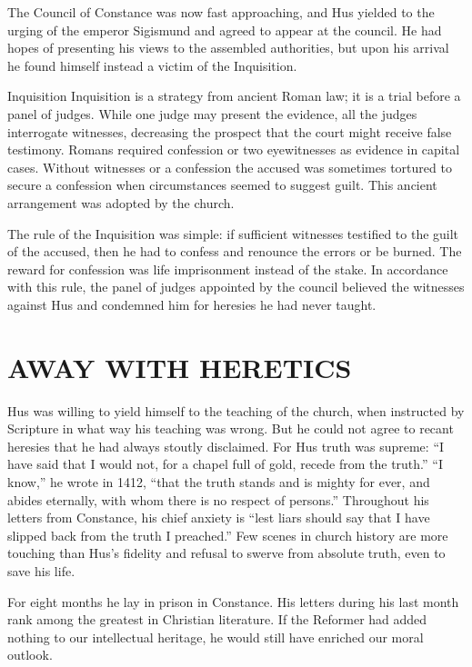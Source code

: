The Council of Constance was now fast approaching, and Hus yielded to the urging of the emperor
Sigismund and agreed to appear at the council. He had hopes of presenting his views to the assembled
authorities, but upon his arrival he found himself instead a victim of the Inquisition.

\begin{sidebar}{Inquisition}
Inquisition is a strategy from ancient Roman law; it is a trial before a panel of judges. While one
judge may present the evidence, all the judges interrogate witnesses, decreasing the prospect that
the court might receive false testimony. Romans required confession or two eyewitnesses as evidence
in capital cases. Without witnesses or a confession the accused was sometimes tortured to secure a
confession when circumstances seemed to suggest guilt. This ancient arrangement was adopted by the
church.
\end{sidebar}

The rule of the Inquisition was simple: if sufficient witnesses testified to the guilt of the
accused, then he had to confess and renounce the errors or be burned. The reward for confession was
life imprisonment instead of the stake. In accordance with this rule, the panel of judges appointed
by the council believed the witnesses against Hus and condemned him for heresies he had never
taught.

\section{AWAY WITH HERETICS}

Hus was willing to yield himself to the teaching of the church, when instructed by Scripture in what
way his teaching was wrong. But he could not agree to recant heresies that he had always stoutly
disclaimed. For Hus truth was supreme: “I have said that I would not, for a chapel full of gold,
recede from the truth.” “I know,” he wrote in 1412, “that the truth stands and is mighty for ever,
and abides eternally, with whom there is no respect of persons.” Throughout his letters from
Constance, his chief anxiety is “lest liars should say that I have slipped back from the truth I
preached.” Few scenes in church history are more touching than Hus’s fidelity and refusal to swerve
from absolute truth, even to save his life.

For eight months he lay in prison in Constance. His letters during his last month rank among the
greatest in Christian literature. If the Reformer had added nothing to our intellectual heritage, he
would still have enriched our moral outlook.

